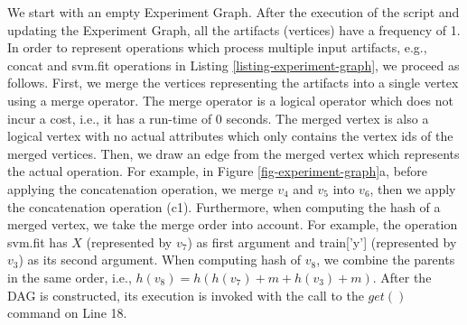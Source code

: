 We start with an empty Experiment Graph.
After the execution of the script and updating the Experiment Graph, all the artifacts (vertices) have a frequency of 1.
In order to represent operations which process multiple input artifacts, e.g., concat and svm.fit operations in Listing \ref{listing-experiment-graph}, we proceed as follows.
First, we merge the vertices representing the artifacts into a single vertex using a merge operator.
The merge operator is a logical operator which does not incur a cost, i.e., it has a run-time of 0 seconds.
The merged vertex is also a logical vertex with no actual attributes which only contains the vertex ids of the merged vertices.
Then, we draw an edge from the merged vertex which represents the actual operation.
For example, in Figure \ref{fig-experiment-graph}a, before applying the concatenation operation, we merge $v_4$ and $v_5$ into $v_6$, then we apply the concatenation operation (c1).
Furthermore, when computing the hash of a merged vertex, we take the merge order into account.
For example, the operation svm.fit has $X$ (represented by $v_7$) as first argument and train['y'] (represented by $v_3$) as its second argument.
When computing hash of $v_8$, we combine the parents in the same order, i.e., $h(v_8) = h(h(v_7) + m + h(v_3) + m)$. 
After the DAG is constructed, its execution is invoked with the call to the $get()$ command on Line 18.

